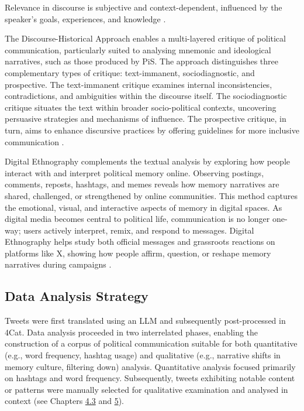 Relevance in discourse is subjective and context-dependent, influenced by the speaker's goals, experiences, and knowledge \citep{van_dijk_principles_1993}.

The Discourse-Historical Approach enables a multi-layered critique of political communication, particularly suited to analysing mnemonic and ideological narratives, such as those produced by PiS. The approach distinguishes three complementary types of critique: text-immanent, sociodiagnostic, and prospective. The text-immanent critique examines internal inconsistencies, contradictions, and ambiguities within the discourse itself. The sociodiagnostic critique situates the text within broader socio-political contexts, uncovering persuasive strategies and mechanisms of influence. The prospective critique, in turn, aims to enhance discursive practices by offering guidelines for more inclusive communication \citep{tracy_critical_2015}.

Digital Ethnography complements the textual analysis by exploring how people interact with and interpret political memory online. Observing postings, comments, reposts, hashtags, and memes reveals how memory narratives are shared, challenged, or strengthened by online communities. This method captures the emotional, visual, and interactive aspects of memory in digital spaces. As digital media becomes central to political life, communication is no longer one-way; users actively interpret, remix, and respond to messages. Digital Ethnography helps study both official messages and grassroots reactions on platforms like X, showing how people affirm, question, or reshape memory narratives during campaigns \citep{matthes_digital_2017}.

\subsection{Data Analysis Strategy}

Tweets were first translated using an LLM and subsequently post-processed in 4Cat. Data analysis proceeded in two interrelated phases, enabling the construction of a corpus of political communication suitable for both quantitative (e.g., word frequency, hashtag usage) and qualitative (e.g., narrative shifts in memory culture, filtering down) analysis. Quantitative analysis focused primarily on hashtags and word frequency. Subsequently, tweets exhibiting notable content or patterns were manually selected for qualitative examination and analysed in context (see Chapters \hyperref[sec:social_media]{4.3} and \hyperref[Chap:Discussion]{5}).


